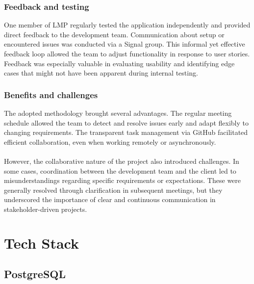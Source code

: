 \documentclass[a4paper,12pt]{report}
\begin{document}
\subsection{Feedback and testing}
One member of LMP regularly tested the application independently and provided direct feedback to the development team. Communication about setup or encountered issues was conducted via a Signal group. This informal yet effective feedback loop allowed the team to adjust functionality in response to user stories. Feedback was especially valuable in evaluating usability and identifying edge cases that might not have been apparent during internal testing. \\

\subsection{Benefits and challenges}
The adopted methodology brought several advantages. The regular meeting schedule allowed the team to detect and resolve issues early and adapt flexibly to changing requirements. The transparent task management via GitHub facilitated efficient collaboration, even when working remotely or asynchronously.\\\\
However, the collaborative nature of the project also introduced challenges. In some cases, coordination between the development team and the client led to misunderstandings regarding specific requirements or expectations. These were generally resolved through clarification in subsequent meetings, but they underscored the importance of clear and continuous communication in stakeholder-driven projects. 

\chapter{Tech Stack}
\section{PostgreSQL}
\end{document}
